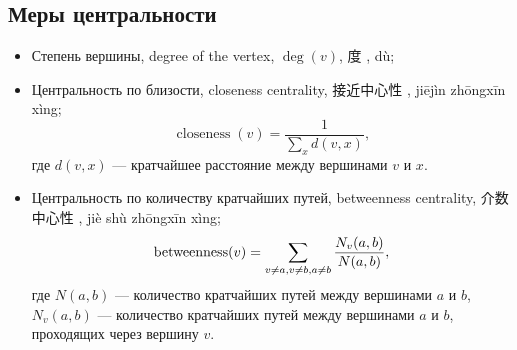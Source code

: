 \documentclass[12pt, a4paper]{article}
\DeclareMathOperator{\closeness}{closeness}
\DeclareMathOperator{\betweenness}{betweenness}
\newcommand{\chinesetext}[1]{\setmainfont{Source Han Sans CN}
#1
\setmainfont{Linux Libertine O}}
\begin{document}
\subsection*{Меры центральности}

\begin{leftbar}
 \begin{itemize}
  \item Степень вершины, degree of the vertex, $\deg(v)$, \chinesetext{度}, dù;
  \item Центральность по близости, closeness centrality, \chinesetext{接近中心性}, jiējìn zhōngxīn xìng;
  \[
    \closeness(v) = \frac{1}{\sum_x d(v, x)},
  \]
  где $d(v, x)$ — кратчайшее расстояние между вершинами $v$ и $x$.
  \item Центральность по количеству кратчайших путей, betweenness centrality, \chinesetext{介数中心性}, jiè shù zhōngxīn xìng;
  \[
    \betweenness(v) = \sum_{v \neq a, v \neq b, \\ a \neq b} \frac{N_v(a, b)}{N(a, b)},
  \]
  где $N(a, b)$ — количество кратчайших путей между вершинами $a$ и $b$,
  $N_v(a, b)$ — количество кратчайших путей между вершинами $a$ и $b$, проходящих через вершину $v$.
 \end{itemize}

\end{leftbar}
\end{document}
